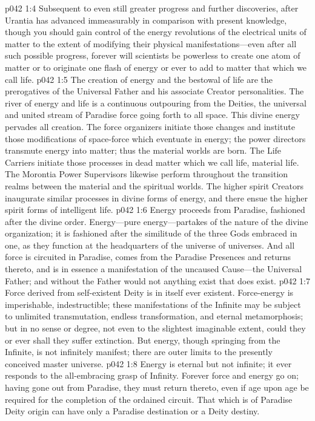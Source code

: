 \vs p042 1:4 Subsequent to even still greater progress and further discoveries, after Urantia has advanced immeasurably in comparison with present knowledge, though you should gain control of the energy revolutions of the electrical units of matter to the extent of modifying their physical manifestations---even after all such possible progress, forever will scientists be powerless to create one atom of matter or to originate one flash of energy or ever to add to matter that which we call life.
\pc \vs p042 1:5 The creation of energy and the bestowal of life are the prerogatives of the Universal Father and his associate Creator personalities. The river of energy and life is a continuous outpouring from the Deities, the universal and united stream of Paradise force going forth to all space. This divine energy pervades all creation. The force organizers initiate those changes and institute those modifications of space\hyp{}force which eventuate in energy; the power directors transmute energy into matter; thus the material worlds are born. The Life Carriers initiate those processes in dead matter which we call life, material life. The Morontia Power Supervisors likewise perform throughout the transition realms between the material and the spiritual worlds. The higher spirit Creators inaugurate similar processes in divine forms of energy, and there ensue the higher spirit forms of intelligent life.
\pc \vs p042 1:6 Energy proceeds from Paradise, fashioned after the divine order. Energy---pure energy---partakes of the nature of the divine organization; it is fashioned after the similitude of the three Gods embraced in one, as they function at the headquarters of the universe of universes. And all force is circuited in Paradise, comes from the Paradise Presences and returns thereto, and is in essence a manifestation of the uncaused Cause---the Universal Father; and without the Father would not anything exist that does exist.
\vs p042 1:7 Force derived from self\hyp{}existent Deity is in itself ever existent. Force\hyp{}energy is imperishable, indestructible; these manifestations of the Infinite may be subject to unlimited transmutation, endless transformation, and eternal metamorphosis; but in no sense or degree, not even to the slightest imaginable extent, could they or ever shall they suffer extinction. But energy, though springing from the Infinite, is not infinitely manifest; there are outer limits to the presently conceived master universe.
\vs p042 1:8 Energy is eternal but not infinite; it ever responds to the all\hyp{}embracing grasp of Infinity. Forever force and energy go on; having gone out from Paradise, they must return thereto, even if age upon age be required for the completion of the ordained circuit. That which is of Paradise Deity origin can have only a Paradise destination or a Deity destiny.
